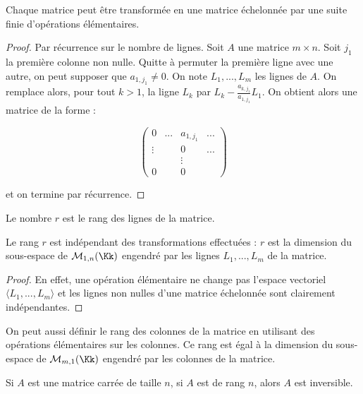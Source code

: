 \documentclass[class=report,crop=false]{standalone}
\begin{document}
\begin{theoreme}
Chaque matrice peut être transformée en une matrice échelonnée par une suite finie d'opérations élémentaires.
\end{theoreme}

\begin{proof}
Par récurrence sur le nombre de lignes. Soit $A$ une matrice $m \times n$. Soit $j_1$ la première colonne non nulle. Quitte à permuter la première ligne avec une autre, on peut supposer que $a_{1,j_1} \neq 0$. On note $L_1,...,L_m$ les lignes  de $A$. On remplace alors, pour tout $k >1$, la ligne $L_k$ par $L_k -\frac{a_{k,j_1}}{a_{1,j_1}}L_1$. On obtient alors une matrice de la forme :

\[\left(\begin{array}{cccc}
0 & ... & a_{1,j_1}&...\\
\vdots & &0&...\\
&&\vdots&\\
0&&0&
\end{array}
\right)\]

et on termine par récurrence.
\end{proof}

\begin{definition}
Le nombre $r$ est le rang des lignes de la matrice.
\end{definition}


\begin{proposition}
Le rang $r$ est indépendant des transformations effectuées : $r$ est la dimension du sous-espace de $\mathcal{M}_{1,n}(\Kk)$ engendré par les lignes $L_1,...,L_m$ de la matrice.
\end{proposition}



\begin{proof}
En effet, une opération élémentaire ne change pas l'espace vectoriel $\langle L_1,...,L_m\rangle$ et les lignes non nulles d'une matrice échelonnée sont clairement indépendantes.
\end{proof}

On peut aussi définir le rang des colonnes de la matrice en utilisant des opérations élémentaires sur les colonnes. Ce rang est égal à la dimension du sous-espace de $\mathcal{M}_{m,1}(\Kk)$ engendré par les colonnes de la matrice.


\begin{proposition}
Si $A$ est une matrice carrée de taille $n$, si $A$ est de rang $n$, alors $A$ est inversible.
\end{proposition}
\end{document}
